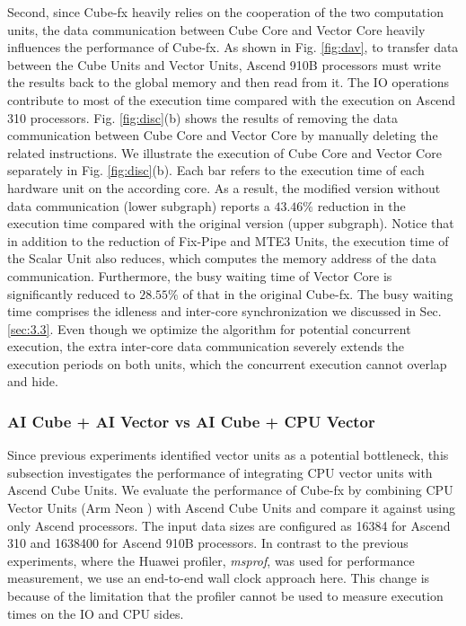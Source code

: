 Second, since Cube-fx heavily relies on the cooperation of the two computation units, the data communication between Cube Core and Vector Core heavily influences the performance of Cube-fx. As shown in Fig. \ref{fig:dav}, to transfer data between the Cube Units and Vector Units, Ascend 910B processors must write the results back to the global memory and then read from it. The IO operations contribute to most of the execution time compared with the execution on Ascend 310 processors. Fig. \ref{fig:disc}(b) shows the results of removing the data communication between Cube Core and Vector Core by manually deleting the related instructions. We illustrate the execution of Cube Core and Vector Core separately in Fig. \ref{fig:disc}(b). Each bar refers to the execution time of each hardware unit on the according core. As a result, the modified version without data communication (lower subgraph) reports a $43.46\%$ reduction in the execution time compared with the original version (upper subgraph). Notice that in addition to the reduction of Fix-Pipe and MTE3 Units, the execution time of the Scalar Unit also reduces, which computes the memory address of the data communication. Furthermore, the busy waiting time of Vector Core is significantly reduced to $28.55\%$ of that in the original Cube-fx. The busy waiting time comprises the idleness and inter-core synchronization we discussed in Sec. \ref{sec:3.3}. Even though we optimize the algorithm for potential concurrent execution, the extra inter-core data communication severely extends the execution periods on both units, which the concurrent execution cannot overlap and hide.

\subsubsection{AI Cube + AI Vector vs AI Cube + CPU Vector}

Since previous experiments identified vector units as a potential bottleneck, this subsection investigates the performance of integrating CPU vector units with Ascend Cube Units. We evaluate the performance of Cube-fx by combining CPU Vector Units (Arm Neon \cite{neon}) with Ascend Cube Units and compare it against using only Ascend processors. The input data sizes are configured as 16384 for Ascend 310 and 1638400 for Ascend 910B processors. In contrast to the previous experiments, where the Huawei profiler, \textit{msprof}, was used for performance measurement, we use an end-to-end wall clock approach here. This change is because of the limitation that the profiler cannot be used to measure execution times on the IO and CPU sides.
  

